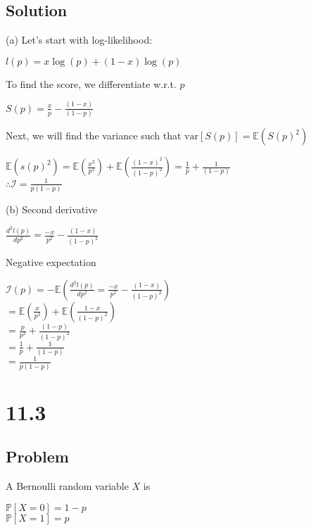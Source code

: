 \documentclass[10pt, a4paper]{article}
\newcommand{\PP}{\mathbb P}
\newcommand{\var}{\text{var}}
\begin{document}
    \subsection*{Solution}
      (a) Let's start with log-likelihood:
      \begin{center}
        $l(p) = x\log(p)+(1-x)\log(p)$
      \end{center}
      To find the score, we differentiate w.r.t. $p$
      \begin{center}
        $S(p)=\frac{x}{p}-\frac{(1-x)}{(1-p)}$
      \end{center}
      Next, we will find the variance such that $\var[S(p)]=\mathbb{E}(S(p)^2)$
      \begin{center}
        $\mathbb{E}(s(p)^2)=\mathbb{E}(\frac{x^2}{p^2})+\mathbb{E}(\frac{(1-x)^2}{(1-p)^2}) = \frac{1}{p}+\frac{1}{(1-p)}$\\
        $\boxed{\therefore \mathcal{I} = \frac{1}{p(1-p)}}$
      \end{center}
      (b) Second derivative 
      \begin{center}
        $\frac{d^2l(p)}{dp^2}=\frac{-x}{p^2}-\frac{(1-x)}{(1-p)^2}$ \\
      \end{center}
      Negative expectation
      \begin{center}
        $\mathcal{I}(p)=-\mathbb{E}(\frac{d^2l(p)}{dp^2}=\frac{-x}{p^2}-\frac{(1-x)}{(1-p)^2})$\\
        $ = \mathbb{E}(\frac{x}{p^2})+\mathbb{E}(\frac{1-x}{(1-p)^2})$ \\
        $ = \frac{p}{p^2}+\frac{(1-p)}{(1-p)^2}$ \\
        $ = \frac{1}{p}+\frac{1}{(1-p)}$ \\
        $\boxed{ = \frac{1}{p(1-p)}}$ 
      \end{center}
  \section*{11.3}
    \subsection*{Problem}
      A Bernoulli random variable $X$ is
      \begin{center}
        $\PP[X=0]=1-p$ \\
        $\PP[X=1]=p$ \\
      \end{center}
\end{document}
